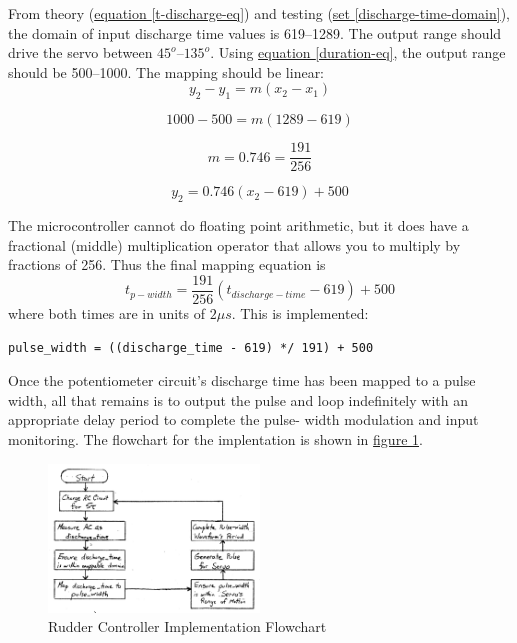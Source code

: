 \documentclass[11pt]{article}
\begin{document}
From theory (\hyperref[t-discharge-eq]{equation \ref{t-discharge-eq}})
and testing (\hyperref[discharge-time-domain]{set \ref{discharge-time-domain}}),
the domain of input discharge time values is 619--1289.
The output range should drive the servo between $45^{o}$--$135^{o}$.
Using \hyperref[duration-eq]{equation \ref{duration-eq}}, the output
range should be 500--1000. The mapping should be linear:
\begin{equation*}
y_{2}-y_{1}=m(x_{2}-x_{1})
\end{equation*}

\begin{equation*}
1000-500=m(1289-619)
\end{equation*}

\begin{equation*}
m=0.746=\frac{191}{256}
\end{equation*}

\begin{equation*}
y_{2}=0.746(x_{2}-619)+500
\end{equation*}

The microcontroller cannot do floating point arithmetic, but it does
have a fractional (middle) multiplication operator that allows you
to multiply by fractions of 256. Thus the final mapping equation is
\begin{equation}
t_{p-width}=\frac{191}{256}(t_{discharge-time}-619)+500
\end{equation}
where both times are in units of $2\mu s$. This is implemented:

\begin{center}
\mbox{\texttt{pulse\_width = ((discharge\_time - 619) */ 191) + 500}}
\end{center}

Once the potentiometer circuit's discharge time has been mapped
to a pulse width, all that remains is to output the pulse and loop
indefinitely with an appropriate delay period to complete the pulse-
width modulation and input monitoring. The flowchart for the implentation
is shown in \hyperref[rudder-flowchart]{figure \ref{rudder-flowchart}}.

\begin{figure}[ht]
\centering
\includegraphics[width=0.5\textwidth]{rudder-flowchart.pdf}
\caption{Rudder Controller Implementation Flowchart}
\label{rudder-flowchart}
\end{figure}
\end{document}
